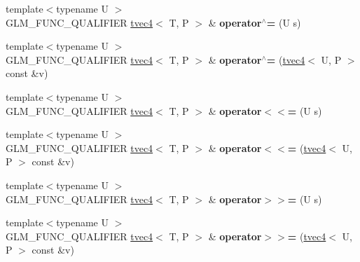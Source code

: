 \begin{DoxyCompactItemize}
\item 
{\footnotesize template$<$typename U $>$ }\\G\+L\+M\+\_\+\+F\+U\+N\+C\+\_\+\+Q\+U\+A\+L\+I\+F\+I\+ER \hyperlink{structglm_1_1detail_1_1tvec4}{tvec4}$<$ T, P $>$ \& {\bfseries operator$^\wedge$=} (U s)\hypertarget{structglm_1_1detail_1_1tvec4_a3c211495ff2065e67eec3738f67395ff}{}\label{structglm_1_1detail_1_1tvec4_a3c211495ff2065e67eec3738f67395ff}

\item 
{\footnotesize template$<$typename U $>$ }\\G\+L\+M\+\_\+\+F\+U\+N\+C\+\_\+\+Q\+U\+A\+L\+I\+F\+I\+ER \hyperlink{structglm_1_1detail_1_1tvec4}{tvec4}$<$ T, P $>$ \& {\bfseries operator$^\wedge$=} (\hyperlink{structglm_1_1detail_1_1tvec4}{tvec4}$<$ U, P $>$ const \&v)\hypertarget{structglm_1_1detail_1_1tvec4_af96b8c8c3da7f1d716d6b95c77170172}{}\label{structglm_1_1detail_1_1tvec4_af96b8c8c3da7f1d716d6b95c77170172}

\item 
{\footnotesize template$<$typename U $>$ }\\G\+L\+M\+\_\+\+F\+U\+N\+C\+\_\+\+Q\+U\+A\+L\+I\+F\+I\+ER \hyperlink{structglm_1_1detail_1_1tvec4}{tvec4}$<$ T, P $>$ \& {\bfseries operator$<$$<$=} (U s)\hypertarget{structglm_1_1detail_1_1tvec4_a08906968ad1d2a2e5b467e140f7a5550}{}\label{structglm_1_1detail_1_1tvec4_a08906968ad1d2a2e5b467e140f7a5550}

\item 
{\footnotesize template$<$typename U $>$ }\\G\+L\+M\+\_\+\+F\+U\+N\+C\+\_\+\+Q\+U\+A\+L\+I\+F\+I\+ER \hyperlink{structglm_1_1detail_1_1tvec4}{tvec4}$<$ T, P $>$ \& {\bfseries operator$<$$<$=} (\hyperlink{structglm_1_1detail_1_1tvec4}{tvec4}$<$ U, P $>$ const \&v)\hypertarget{structglm_1_1detail_1_1tvec4_a22bfc21e16155253755657844ca76d36}{}\label{structglm_1_1detail_1_1tvec4_a22bfc21e16155253755657844ca76d36}

\item 
{\footnotesize template$<$typename U $>$ }\\G\+L\+M\+\_\+\+F\+U\+N\+C\+\_\+\+Q\+U\+A\+L\+I\+F\+I\+ER \hyperlink{structglm_1_1detail_1_1tvec4}{tvec4}$<$ T, P $>$ \& {\bfseries operator$>$$>$=} (U s)\hypertarget{structglm_1_1detail_1_1tvec4_a7fe7eefe66d5c896d21c32a4ec597cae}{}\label{structglm_1_1detail_1_1tvec4_a7fe7eefe66d5c896d21c32a4ec597cae}

\item 
{\footnotesize template$<$typename U $>$ }\\G\+L\+M\+\_\+\+F\+U\+N\+C\+\_\+\+Q\+U\+A\+L\+I\+F\+I\+ER \hyperlink{structglm_1_1detail_1_1tvec4}{tvec4}$<$ T, P $>$ \& {\bfseries operator$>$$>$=} (\hyperlink{structglm_1_1detail_1_1tvec4}{tvec4}$<$ U, P $>$ const \&v)\hypertarget{structglm_1_1detail_1_1tvec4_a080d672296e86beecd2d91b75bc0e843}{}\label{structglm_1_1detail_1_1tvec4_a080d672296e86beecd2d91b75bc0e843}

\end{DoxyCompactItemize}
